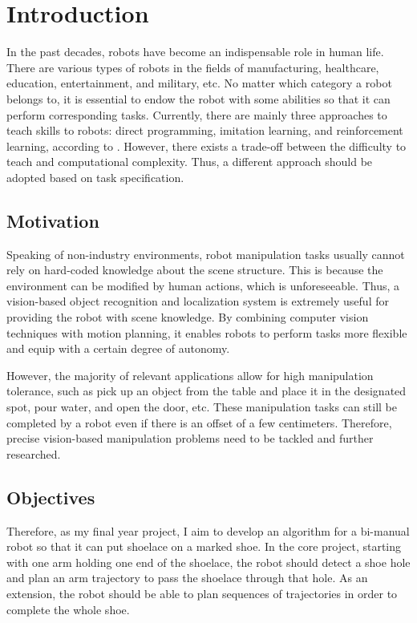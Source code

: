 \chapter{Introduction}

In the past decades, robots have become an indispensable role in human life. There are various types of robots in the fields of manufacturing, healthcare, education, entertainment, and military, etc. No matter which category a robot belongs to, it is essential to endow the robot with some abilities so that it can perform corresponding tasks. Currently, there are mainly three approaches to teach skills to robots: direct programming, imitation learning, and reinforcement learning, according to \citep{Kormushev_MDPI_2013}. However, there exists a trade-off between the difficulty to teach and computational complexity. Thus, a different approach should be adopted based on task specification.

\section{Motivation}
Speaking of non-industry environments, robot manipulation tasks usually cannot rely on hard-coded knowledge about the scene structure. This is because the environment can be modified by human actions, which is unforeseeable. Thus, a vision-based object recognition and localization system is extremely useful for providing the robot with scene knowledge. By combining computer vision techniques with motion planning, it enables robots to perform tasks more flexible and equip with a certain degree of autonomy.

However, the majority of relevant applications allow for high manipulation tolerance, such as pick up an object from the table and place it in the designated spot, pour water, and open the door, etc. These manipulation tasks can still be completed by a robot even if there is an offset of a few centimeters. Therefore, precise vision-based manipulation problems need to be tackled and further researched.

\section{Objectives}
Therefore, as my final year project, I aim to develop an algorithm for a bi-manual robot so that it can put shoelace on a marked shoe. In the core project, starting with one arm holding one end of the shoelace, the robot should detect a shoe hole and plan an arm trajectory to pass the shoelace through that hole. As an extension, the robot should be able to plan sequences of trajectories in order to complete the whole shoe.

